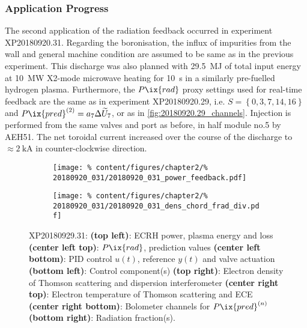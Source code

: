         \subsubsection*{Application Progress}%
%
            The second application of the radiation feedback occurred in experiment XP20180920.31. Regarding the boronisation, the influx of impurities from the wall and general machine condition are assumed to be same as in the previous experiment. This discharge was also planned with \SI{29.5}{\mega\joule} of total input energy at \SI{10}{\mega\watt} X2-mode microwave heating for \SI{10}{\second} in a similarly pre-fuelled hydrogen plasma. Furthermore, the $P\ix{rad}$ proxy settings used for real-time feedback are the same as in experiment XP20180920.29, i.e. $S=\left\{0, 3, 7, 14, 16\right\}$ and $P\ix{pred}^{\left(2\right)}=a_{7}\Delta\widetilde{U}_{7}$, or as in \cref{fig:20180920.29_channels}. Injection is performed from the same valves and port as before, in half module no.5 by AEH51. The net toroidal current increased over the course of the discharge to $\approx\SI{2}{\kilo\ampere}$ in counter-clockwise direction.\\%
%
            \begin{figure}[t]%
                \centering%
                \begin{subfigure}{.48\textwidth}%
                    \centering%
                    \texttt{[image: \%
                        content/figures/chapter2/\%
                        20180920\_031/20180920\_031\_power\_feedback.pdf]}%
                \end{subfigure}%
                \hspace*{0.2cm}%
                \begin{subfigure}{.48\textwidth}%
                    \centering%
                    \texttt{[image: \%
                        content/figures/chapter2/\%
                        20180920\_031/20180920\_031\_dens\_chord\_frad\_div.pdf]}%
                \end{subfigure}%
                \caption{%
                    XP20180929.31: %
                    \textbf{(top left)}: ECRH power, plasma energy and loss \textbf{(center left top)}: $P\ix{rad}$, prediction values \textbf{(center left bottom)}: PID control $u\left(t\right)$, reference $y\left(t\right)$ and valve actuation \textbf{(bottom left)}: Control component(s) \textbf{(top right)}: Electron density of Thomson scattering and dispersion interferometer \textbf{(center right top)}: Electron temperature of Thomson scattering and ECE \textbf{(center right bottom)}: Bolometer channels for $P\ix{pred}^{\left(n\right)}$ \textbf{(bottom right)}: Radiation fraction(s).}\label{fig:20180920.31_PDF}%
            \end{figure}%
